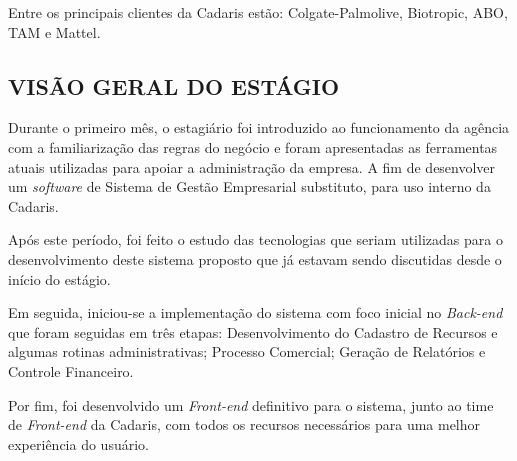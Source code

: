 \documentclass[
  12pt,				%
  openany,
  oneside,
  a4paper,			%
  english,			%
  brazil
]{article}
\numberwithin{figure}{section}
\numberwithin{table}{section}
\begin{document}
Entre os principais clientes da Cadaris estão: Colgate-Palmolive, Biotropic, ABO, TAM e Mattel.


\subsection{VISÃO GERAL DO ESTÁGIO}


Durante o primeiro mês, o estagiário foi introduzido ao funcionamento da agência com a familiarização das regras do negócio e foram apresentadas as ferramentas atuais utilizadas para apoiar a administração da empresa. A fim de desenvolver um \textit{software} de Sistema de Gestão Empresarial substituto, para uso interno da Cadaris.

Após este período, foi feito o estudo das tecnologias que seriam utilizadas para o desenvolvimento deste sistema proposto que já estavam sendo discutidas desde o início do estágio.

Em seguida, iniciou-se a implementação do sistema com foco inicial no \textit{Back-end} que foram seguidas em três etapas: Desenvolvimento do Cadastro de Recursos e algumas rotinas administrativas; Processo Comercial; Geração de Relatórios e Controle Financeiro.

Por fim, foi desenvolvido um \textit{Front-end} definitivo para o sistema, junto ao time de \textit{Front-end} da Cadaris, com todos os recursos necessários para uma melhor experiência do usuário.



%
%
%
%
%
%
\end{document}

